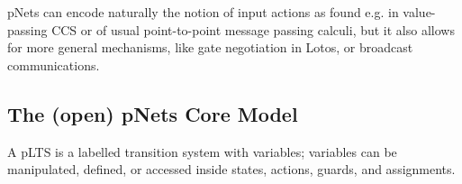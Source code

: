 \documentclass{lncs/llncs}
\newcommand{\TODO}[1]{\textcolor{red}{\textbf{[TODO:#1]}}}
\newcommand{\QIN}[1]{\textcolor{airforceblue}{#1}}
\def\AlgT{\mathcal{T}}
\begin{document}


pNets can encode naturally the notion of input actions as found e.g. in value-passing CCS
\cite{Milner89} or of usual point-to-point message passing calculi, but it also allows
for more general mechanisms, like gate negotiation in Lotos, or broadcast
communications.





\subsection{The (open) pNets Core Model}
\label{section:pNets}


A pLTS is a labelled transition system with variables; variables can be
manipulated, defined, or accessed inside states, actions, guards, and
assignments. 

\end{document}
